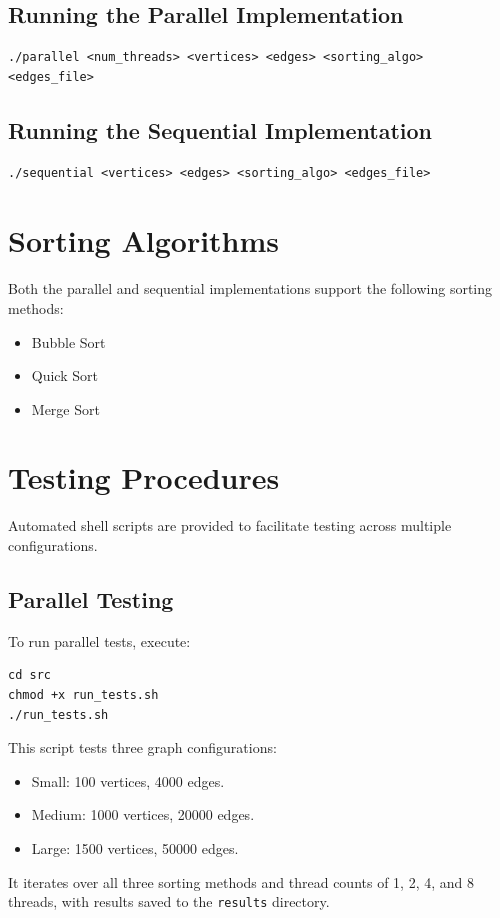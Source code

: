 \documentclass[11pt]{article}
\begin{document}
\subsection{Running the Parallel Implementation}
\begin{lstlisting}
./parallel <num_threads> <vertices> <edges> <sorting_algo> <edges_file>
\end{lstlisting}

\subsection{Running the Sequential Implementation}
\begin{lstlisting}
./sequential <vertices> <edges> <sorting_algo> <edges_file>
\end{lstlisting}

\section{Sorting Algorithms}
Both the parallel and sequential implementations support the following sorting methods:
\begin{itemize}
    \item Bubble Sort
    \item Quick Sort
    \item Merge Sort
\end{itemize}

\section{Testing Procedures}
Automated shell scripts are provided to facilitate testing across multiple configurations.

\subsection{Parallel Testing}
To run parallel tests, execute:
\begin{lstlisting}
cd src
chmod +x run_tests.sh
./run_tests.sh
\end{lstlisting}
This script tests three graph configurations:
\begin{itemize}
    \item Small: 100 vertices, 4000 edges.
    \item Medium: 1000 vertices, 20000 edges.
    \item Large: 1500 vertices, 50000 edges.
\end{itemize}
It iterates over all three sorting methods and thread counts of 1, 2, 4, and 8 threads, with results saved to the \texttt{results} directory.
\end{document}
